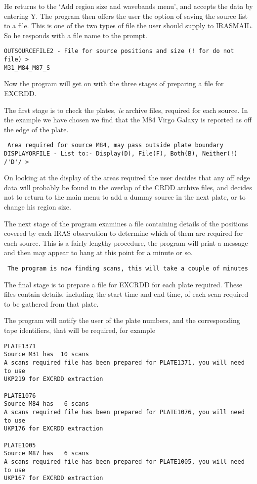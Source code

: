 He returns to the `Add region size and wavebands menu', and accepts the data by
entering Y. The program then offers the user the option of saving the source
list to a file. This is one of the two types of file the user should supply to
IRASMAIL. So he responds with a file name to the prompt.

\begin{verbatim}
OUTSOURCEFILE2 - File for source positions and size (! for do not file) >
M31_M84_M87_S
\end{verbatim}

Now the program will get on with the three stages of preparing a file for
EXCRDD.

The first stage is to check the plates, {\it ie} archive files, required for
each source. In the example we have chosen we find that the M84 Virgo Galaxy is
reported as off the edge of the plate. 

\begin{verbatim}
 Area required for source M84, may pass outside plate boundary
DISPLAYORFILE - List to:- Display(D), File(F), Both(B), Neither(!) /'D'/ > 
\end{verbatim}

On looking at the display of the areas required the user decides that any
off edge data will probably be found in the overlap of the CRDD archive files,
and decides not to return to the main menu to add a dummy source in the
next plate, or to change his region size.

The next stage of the program examines a file containing details of the
positions covered by each IRAS observation to determine which of them are
required for each source. This is a fairly lengthy procedure, the program will
print a message and then may appear to hang at this point for a minute or so.

\begin{verbatim}
 The program is now finding scans, this will take a couple of minutes
\end{verbatim}

The final stage is to prepare a file for EXCRDD for each plate required. These
files contain details, including the start time and end time, of each scan
required to be gathered from that plate.

The program will notify the user of the plate numbers, and the corresponding
tape identifiers, that will be required, for example

\begin{verbatim}
PLATE1371
Source M31 has  10 scans
A scans required file has been prepared for PLATE1371, you will need to use
UKP219 for EXCRDD extraction

PLATE1076
Source M84 has   6 scans
A scans required file has been prepared for PLATE1076, you will need to use
UKP176 for EXCRDD extraction

PLATE1005
Source M87 has   6 scans
A scans required file has been prepared for PLATE1005, you will need to use
UKP167 for EXCRDD extraction
\end{verbatim}

